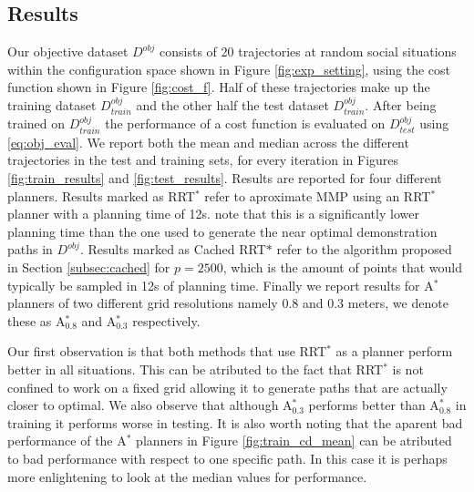 \documentclass{article}  %
\begin{document}
	\subsection{Results}

	Our objective dataset $D^{obj}$ consists of 20 trajectories at random social situations within the configuration space shown in Figure \ref{fig:exp_setting}, using the cost function shown in Figure \ref{fig:cost_f}. Half of these trajectories make up the training dataset $D^{obj}_{train}$ and the other half the test dataset $D^{obj}_{train}$. After being trained on $D^{obj}_{train}$ the performance of a cost function is evaluated on $D^{obj}_{test}$ using \ref{eq:obj_eval}. We report both the mean and median across the different trajectories in the test and training sets, for every iteration in Figures \ref{fig:train_results} and \ref{fig:test_results}. Results are reported for four different planners. Results marked as RRT$^*$ refer to aproximate MMP using an RRT$^*$ planner with a planning time of 12s. note that this is a significantly lower planning time than the one used to generate the near optimal demonstration paths in $D^{obj}$. Results marked as Cached RRT$*$ refer to the algorithm proposed in Section \ref{subsec:cached} for $p=2500$, which is the amount of points that would typically be sampled in 12s of planning time. Finally we report results for A$^*$ planners of two different grid resolutions namely 0.8 and 0.3 meters, we denote these as A$_{0.8}^*$ and A$_{0.3}^*$ respectively.

	Our first observation is that both methods that use RRT$^*$ as a planner perform better in all situations. This can be atributed to the fact that RRT$^*$ is not confined to work on a fixed grid allowing it to generate paths that are actually closer to optimal. We also observe that although A$_{0.3}^*$ performs better than A$_{0.8}^*$ in training it performs worse in testing. It is also worth noting that the aparent bad performance of the A$^*$ planners in Figure \ref{fig:train_cd_mean} can be atributed to bad performance with respect to one specific path. In this case it is perhaps more enlightening to look at the median values for performance.
\end{document}
